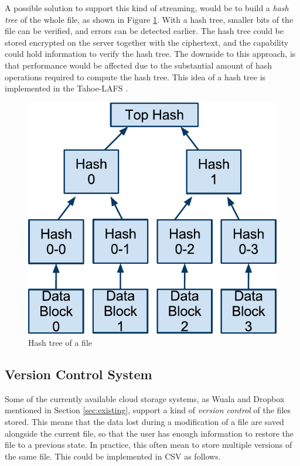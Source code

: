 \documentclass[pdftex,english,10pt,b5paper,twoside]{book}
\begin{document}
A possible solution to support this kind of streaming, would be to build a
\emph{hash tree} of the whole file, as shown in Figure \ref{fig:hashtree}. With
a hash tree, smaller bits of the file can be verified, and errors can be
detected earlier. The hash tree could be stored encrypted on the server
together with the ciphertext, and the capability could hold information to
verify the hash tree. The downside to this approach, is that performance would
be affected due to the substantial amount of hash operations required to
compute the hash tree. This idea of a hash tree is implemented in the
Tahoe-\ac{LAFS} \cite{tahoe}.

\begin{figure}[!h]
\centering
\includegraphics[scale=0.55]{hash-tree.pdf}
\caption{Hash tree of a file}
\label{fig:hashtree}
\end{figure}

\subsection{Version Control System}

Some of the currently available cloud storage systems, as Wuala and Dropbox
mentioned in Section \ref{sec:existing}, support a kind of \emph{version
control} of the files stored. This means that the data lost during a
modification of a file are saved alongside the current file, so that the user
has enough information to restore the file to a previous state.  In practice,
this often mean to store multiple versions of the same file.  This could be
implemented in \ac{CSV} as follows.
\end{document}
